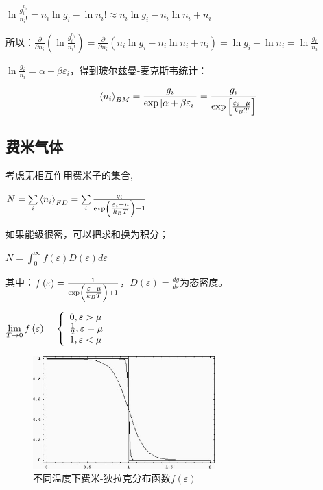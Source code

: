 $\ln \frac{{g_i ^{n_i } }}{{n_i !}} = n_i \ln g_i  - \ln n_i ! \approx n_i \ln g_i  - n_i \ln n_i  + n_i $

所以：$\frac{\partial }{{\partial n_i }}\left( {\ln \frac{{g_i ^{n_i } }}{{n_i !}}} \right) = \frac{\partial }{{\partial n_i }}\left( {n_i \ln g_i  - n_i \ln n_i  + n_i } \right) = \ln g_i  - \ln n_i  = \ln \frac{{g_i }}{{n_i }}$

$\ln \frac{{g_i }}{{n_i }} = \alpha  + \beta \varepsilon _i $，得到玻尔兹曼-麦克斯韦统计：


\begin{equation}\label{33-9}
\left\langle {n_i } \right\rangle _{BM}  = \frac{{g_i }}{{\exp \left[ {\alpha  + \beta \varepsilon _i } \right]}} = \frac{{g_i }}{{\exp \left[ {{\textstyle{{\varepsilon _i  - \mu } \over {k_B T}}}} \right]}}
\end{equation}


\subsection{费米气体}


考虑无相互作用费米子的集合,

$N = \sum\limits_i {\left\langle {n_i } \right\rangle _{FD} }  = \sum\limits_i {\frac{{g_i }}{{\exp \left( {{\textstyle{{\varepsilon _i  - \mu } \over {k_B T}}}} \right) + 1}}} $

如果能级很密，可以把求和换为积分；


$N = \int_0^\infty  {f\left( \varepsilon  \right)D\left( \varepsilon  \right)d\varepsilon } $


其中：$f\left( \varepsilon  \right) = \frac{1}{{\exp \left( {{\textstyle{{\varepsilon  - \mu } \over {k_B T}}}} \right) + 1}}$，$D\left( \varepsilon  \right) = \frac{{dg}}{{d\varepsilon }}$为态密度。


$\mathop {\lim }\limits_{T \to 0} f\left( \varepsilon  \right) = \left\{ \begin{array}{l}
 0,\varepsilon  > \mu  \\
 {\textstyle{1 \over 2}},\varepsilon  = \mu  \\
 1,\varepsilon  < \mu  \\
 \end{array} \right.$


\begin{figure}[h]
\begin{center}
\includegraphics[clip,width=7cm]{IdenticalParticles/33-1.ps}
\caption{不同温度下费米-狄拉克分布函数$f(\varepsilon)$}
\end{center}
\end{figure}

